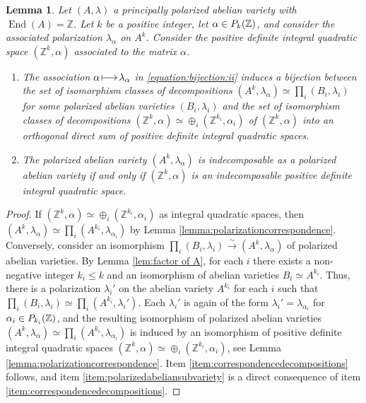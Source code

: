 \documentclass[a4paper,11pt,reqno]{amsart}
\makeatletter
\numberwithin{equation}{section}
\theoremstyle{plain}
\newtheorem{lemma}[theorem]{Lemma}
\theoremstyle{definition}
\newcommand{\Z}{\mathbb Z}
\let\rm\relax
\newcommand{\rm}[1]{{\mathrm{#1}}}
\newcommand{\End}{\operatorname{End}}
\renewcommand{\mapsto}{\xymatrix@1@=15pt{\ar@{|->}[r]&}}
\renewcommand{\cong}{\simeq}
\makeatother
\begin{document}
\begin{lemma}
\label{lemma:polarizationcorrespondence-4} 
Let $(A, \lambda)$ a principally polarized abelian variety with $\End(A) = \Z$. Let $k$ be a positive integer, let $\alpha \in \rm{P}_k(\Z)$, and consider the associated polarization $\lambda_\alpha$ on $A^k$. Consider the positive definite integral quadratic space $(\Z^k, \alpha)$ associated to the matrix $\alpha$. 
 \begin{enumerate} 
 \item \label{item:correspondencedecompositions} The association $\alpha \mapsto \lambda_\alpha$ in \eqref{equation:bijection:ii} induces a bijection between the set of isomorphism classes of decompositions $(A^k, \lambda_\alpha) \cong \prod_i (B_i, \lambda_i)$ for some polarized abelian varieties $(B_i, \lambda_i)$ and the set of isomorphism classes of decompositions $(\Z^k, \alpha) \cong \oplus_i (\Z^{k_i}, \alpha_i)$ of $(\Z^k, \alpha)$ into an orthogonal direct sum of positive definite integral quadratic spaces.  
 \item \label{item:polarizedabeliansubvariety}
 The polarized abelian variety $(A^k, \lambda_\alpha)$ is indecomposable as a polarized abelian variety if and only if $(\Z^k, \alpha)$ is an indecomposable positive definite integral quadratic space.  
 \end{enumerate}
\end{lemma}

\begin{proof}
If $(\Z^k, \alpha) \cong \oplus_i (\Z^{k_i}, \alpha_i)$ as integral quadratic spaces, then $(A^k, \lambda_\alpha) \cong \prod_i (A^{k_i}, \lambda_{\alpha_i})$ by Lemma \ref{lemma:polarizationcorrespondence}. Conversely, consider an isomorphism $ \prod_i (B_i, \lambda_i)  \stackrel{\sim}\to (A^k, \lambda_\alpha) $ of polarized abelian varieties. By Lemma \ref{lem:factor of A}, for each $i$ there exists a non-negative integer $k_i \leq k$ and an isomorphism of abelian varieties $B_i \cong A^{k_i}$. Thus, there is a polarization $\lambda_i'$ on the abelian variety $A^{k_i}$ for each $i$ such that $\prod_i (B_i, \lambda_i) \cong \prod_i (A^{k_i}, \lambda_i')$. Each $\lambda_i'$ is again of the form $\lambda_i' = \lambda_{\alpha_i}$ for $\alpha_i \in \rm{P}_{k_i}(\Z)$, and the resulting isomorphism of polarized abelian varieties $(A^k, \lambda_\alpha) \cong \prod_i (A^{k_i}, \lambda_{\alpha_i})$ is induced by an isomorphism of positive definite integral quadratic spaces $(\Z^k, \alpha) \cong \oplus_i (\Z^{k_i}, \alpha_i)$, see Lemma \ref{lemma:polarizationcorrespondence}. 
Item \eqref{item:correspondencedecompositions} follows, and item \eqref{item:polarizedabeliansubvariety} is a direct consequence of item  \eqref{item:correspondencedecompositions}.
\end{proof}
\end{document}
